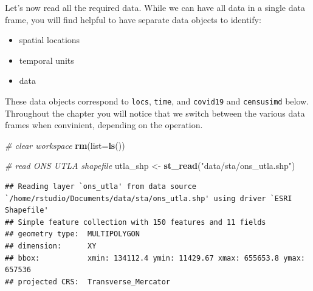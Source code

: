 \documentclass[
]{book}
\newenvironment{Shaded}{\begin{snugshade}}{\end{snugshade}}
\newcommand{\CommentTok}[1]{\textcolor[rgb]{0.56,0.35,0.01}{\textit{#1}}}
\newcommand{\DataTypeTok}[1]{\textcolor[rgb]{0.13,0.29,0.53}{#1}}
\newcommand{\KeywordTok}[1]{\textcolor[rgb]{0.13,0.29,0.53}{\textbf{#1}}}
\newcommand{\NormalTok}[1]{#1}
\newcommand{\OperatorTok}[1]{\textcolor[rgb]{0.81,0.36,0.00}{\textbf{#1}}}
\newcommand{\StringTok}[1]{\textcolor[rgb]{0.31,0.60,0.02}{#1}}
\begin{document}
Let's now read all the required data. While we can have all data in a single data frame, you will find helpful to have separate data objects to identify:

\begin{itemize}
\item
  spatial locations
\item
  temporal units
\item
  data
\end{itemize}

These data objects correspond to \texttt{locs}, \texttt{time}, and \texttt{covid19} and \texttt{censusimd} below. Throughout the chapter you will notice that we switch between the various data frames when convinient, depending on the operation.

\begin{Shaded}
\begin{Highlighting}[]
\CommentTok{# clear workspace}
\KeywordTok{rm}\NormalTok{(}\DataTypeTok{list=}\KeywordTok{ls}\NormalTok{())}

\CommentTok{# read ONS UTLA shapefile}
\NormalTok{utla_shp <-}\StringTok{ }\KeywordTok{st_read}\NormalTok{(}\StringTok{"data/sta/ons_utla.shp"}\NormalTok{) }
\end{Highlighting}
\end{Shaded}

\begin{verbatim}
## Reading layer `ons_utla' from data source `/home/rstudio/Documents/data/sta/ons_utla.shp' using driver `ESRI Shapefile'
## Simple feature collection with 150 features and 11 fields
## geometry type:  MULTIPOLYGON
## dimension:      XY
## bbox:           xmin: 134112.4 ymin: 11429.67 xmax: 655653.8 ymax: 657536
## projected CRS:  Transverse_Mercator
\end{verbatim}

\begin{Shaded}
\end{Shaded}
\end{document}
